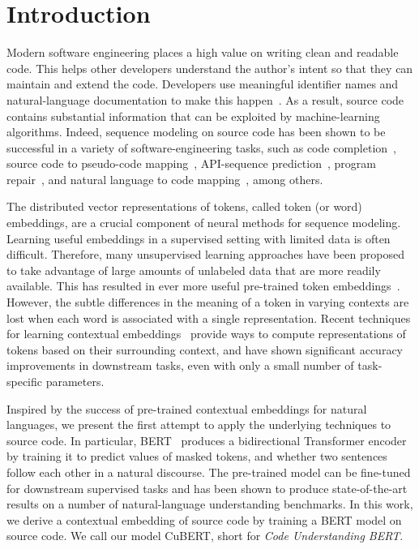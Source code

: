 \documentclass{article}
\newcommand{\BERTforCode}{CuBERT\xspace}
\begin{document}
\section{Introduction}

Modern software engineering places a high value on writing clean and readable code. This helps other developers understand the author's intent so that they can maintain and extend the code. Developers use meaningful identifier names and natural-language documentation to make this happen~\citep{Martin:2008:CCH:1388398}. As a result, source code contains substantial information that can be exploited by machine-learning algorithms. Indeed, sequence modeling on source code has been shown to be successful in a variety of software-engineering tasks, such as code completion~\citep{6227135,Raychev:2014:CCS:2594291.2594321}, source code to pseudo-code mapping~\citep{oda2015learning}, API-sequence prediction~\citep{Gu:2016:DAL:2950290.2950334}, program repair~\citep{Pu:2016:SNP:2984043.2989222,Gupta:2017:DFC:3298239.3298436}, and natural language to code mapping~\citep{DBLP:conf/emnlp/IyerKCZ18}, among others.

The distributed vector representations of tokens, called token (or word) embeddings, are a crucial component of neural methods for sequence modeling. Learning useful embeddings in a supervised setting with limited data is often difficult. Therefore, many unsupervised learning approaches have been proposed to take advantage of large amounts of unlabeled data that are more readily available. This has resulted in ever more useful pre-trained token embeddings~\citep{DBLP:journals/corr/abs-1301-3781,Pennington14glove:global,bojanowski2017enriching}. However, the subtle differences in the meaning of a token in varying contexts are lost when each word is associated with a single representation. Recent techniques for learning contextual embeddings~\citep{NIPS2017_7209,peters2018deep,GPT,radford2019language,devlin-etal-2019-bert,DBLP:journals/corr/abs-1906-08237} provide ways to compute representations of tokens based on their surrounding context, and have shown significant accuracy improvements in downstream tasks, even with only a small number of task-specific parameters.

Inspired by the success of pre-trained contextual embeddings for natural languages, we present the first attempt to apply the underlying techniques to source code. In particular, BERT~\citep{devlin-etal-2019-bert} produces a bidirectional Transformer encoder~\citep{NIPS2017_7181} by training it to predict values of masked tokens, and whether two sentences follow each other in a natural discourse. The pre-trained model can be fine-tuned for downstream supervised tasks and has been shown to produce state-of-the-art results on a number of natural-language understanding benchmarks. In this work, we derive a contextual embedding of source code by training a BERT model on source code. We call our model \BERTforCode, short for \emph{Code Understanding BERT}. 
\end{document}
